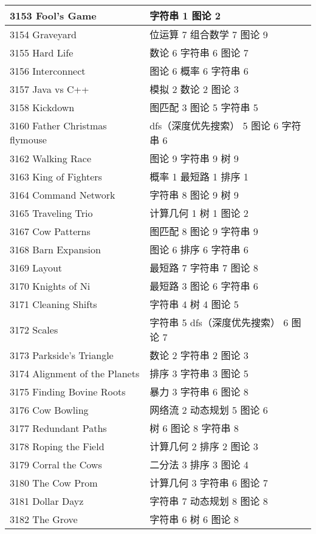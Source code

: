\begin{longtable}{| p{} | p{} |}
 3153 Fool's Game  & 字符串 1 图论 2 \\ \hline
 3154 Graveyard  & 位运算 7 组合数学 7 图论 9 \\ \hline
 3155 Hard Life  & 数论 6 字符串 6 图论 7 \\ \hline
 3156 Interconnect  & 图论 6 概率 6 字符串 6 \\ \hline
 3157 Java vs C++  & 模拟 2 数论 2 图论 3 \\ \hline
 3158 Kickdown  & 图匹配 3 图论 5 字符串 5 \\ \hline
 3160 Father Christmas flymouse  & dfs（深度优先搜索） 5 图论 6 字符串 6 \\ \hline
 3162 Walking Race  & 图论 9 字符串 9 树 9 \\ \hline
 3163 King of Fighters  & 概率 1 最短路 1 排序 1 \\ \hline
 3164 Command Network  & 字符串 8 图论 9 树 9 \\ \hline
 3165 Traveling Trio  & 计算几何 1 树 1 图论 2 \\ \hline
 3167 Cow Patterns  & 图匹配 8 图论 9 字符串 9 \\ \hline
 3168 Barn Expansion  & 图论 6 排序 6 字符串 6 \\ \hline
 3169 Layout  & 最短路 7 字符串 7 图论 8 \\ \hline
 3170 Knights of Ni  & 最短路 3 图论 6 字符串 6 \\ \hline
 3171 Cleaning Shifts  & 字符串 4 树 4 图论 5 \\ \hline
 3172 Scales  & 字符串 5 dfs（深度优先搜索） 6 图论 7 \\ \hline
 3173 Parkside's Triangle  & 数论 2 字符串 2 图论 3 \\ \hline
 3174 Alignment of the Planets  & 排序 3 字符串 3 图论 5 \\ \hline
 3175 Finding Bovine Roots  & 暴力 3 字符串 6 图论 8 \\ \hline
 3176 Cow Bowling  & 网络流 2 动态规划 5 图论 6 \\ \hline
 3177 Redundant Paths  & 树 6 图论 8 字符串 8 \\ \hline
 3178 Roping the Field  & 计算几何 2 排序 2 图论 3 \\ \hline
 3179 Corral the Cows  & 二分法 3 排序 3 图论 4 \\ \hline
 3180 The Cow Prom  & 计算几何 3 字符串 6 图论 7 \\ \hline
 3181 Dollar Dayz  & 字符串 7 动态规划 8 图论 8 \\ \hline
 3182 The Grove  & 字符串 6 树 6 图论 8 \\ \hline

\end{longtable}
